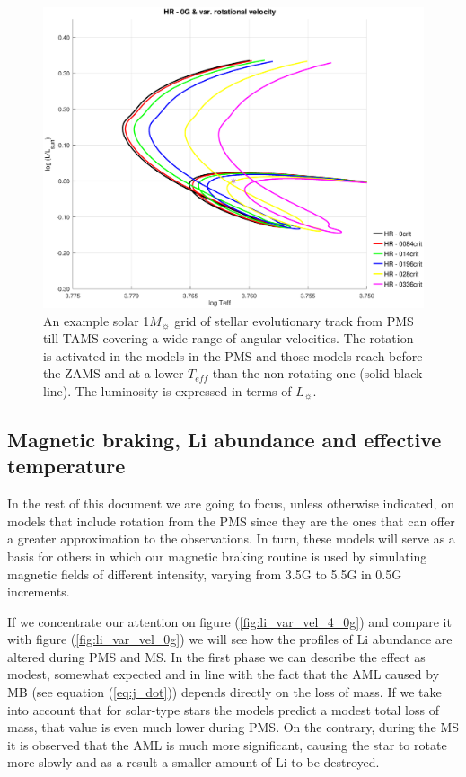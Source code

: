 \documentclass[fleqn,usenatbib]{mnras}
\begin{document}
\begin{figure}
	\includegraphics[trim = 30mm 15mm 20mm 15mm, clip,width=\columnwidth]{figures/hr_var_vel_0_0g_z1.eps}
    \caption{An example solar 1$M_{\sun}$ grid of stellar evolutionary track from PMS till TAMS covering a wide range of angular velocities. The rotation is activated in the models in the PMS and those models reach before the ZAMS and at a lower $T_{eff}$ than the non-rotating one (solid black line). The luminosity is expressed in terms of $L_{\sun}$.}
    \label{fig:hr_var_vel_0g}
\end{figure}

\subsection{Magnetic braking, Li abundance and effective temperature}
In the rest of this document we are going to focus, unless otherwise indicated, on models that include rotation from the PMS since they are the ones that can offer a greater approximation to the observations. In turn, these models will serve as a basis for others in which our magnetic braking routine is used by simulating magnetic fields of different intensity, varying from 3.5G to 5.5G in 0.5G increments.\par

If we concentrate our attention on figure (\ref{fig:li_var_vel_4_0g}) and compare it with figure (\ref{fig:li_var_vel_0g}) we will see how the profiles of Li abundance are altered during PMS and MS. In the first phase we can describe the effect as modest, somewhat expected and in line with the fact that the AML caused by MB (see equation (\ref{eq:j_dot})) depends directly on the loss of mass. If we take into account that for solar-type stars the models predict a modest total loss of mass, that value is even much lower during PMS. On the contrary, during the MS it is observed that the AML is much more significant, causing the star to rotate more slowly and as a result a smaller amount of Li to be destroyed.\par
\end{document}
